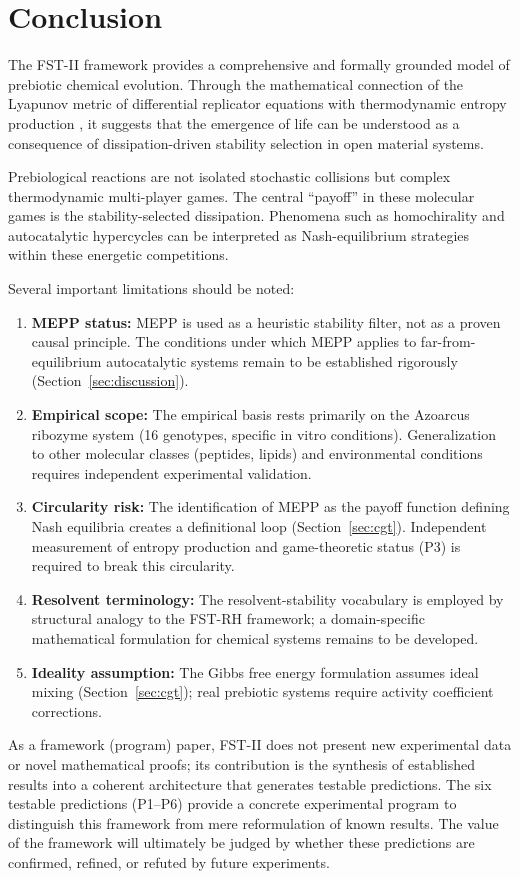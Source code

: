 \documentclass[12pt,a4paper]{article}
\theoremstyle{remark}
\begin{document}
\section{Conclusion}
\label{sec:conclusion}

The FST-II framework provides a comprehensive and formally grounded model of prebiotic chemical evolution. Through the mathematical connection of the Lyapunov metric of differential replicator equations with thermodynamic entropy production \citep{ReplicatorEntropy}, it suggests that the emergence of life can be understood as a consequence of dissipation-driven stability selection in open material systems.

Prebiological reactions are not isolated stochastic collisions but complex thermodynamic multi-player games. The central ``payoff'' in these molecular games is the stability-selected dissipation. Phenomena such as homochirality and autocatalytic hypercycles can be interpreted as Nash-equilibrium strategies within these energetic competitions.

Several important limitations should be noted:
\begin{enumerate}[label=(L\arabic*)]
    \item \textbf{MEPP status:} MEPP is used as a heuristic stability filter, not as a proven causal principle. The conditions under which MEPP applies to far-from-equilibrium autocatalytic systems remain to be established rigorously (Section~\ref{sec:discussion}).
    \item \textbf{Empirical scope:} The empirical basis rests primarily on the Azoarcus ribozyme system (16 genotypes, specific in vitro conditions). Generalization to other molecular classes (peptides, lipids) and environmental conditions requires independent experimental validation.
    \item \textbf{Circularity risk:} The identification of MEPP as the payoff function defining Nash equilibria creates a definitional loop (Section~\ref{sec:cgt}). Independent measurement of entropy production and game-theoretic status (P3) is required to break this circularity.
    \item \textbf{Resolvent terminology:} The resolvent-stability vocabulary is employed by structural analogy to the FST-RH framework; a domain-specific mathematical formulation for chemical systems remains to be developed.
    \item \textbf{Ideality assumption:} The Gibbs free energy formulation assumes ideal mixing (Section~\ref{sec:cgt}); real prebiotic systems require activity coefficient corrections.
\end{enumerate}
As a framework (program) paper, FST-II does not present new experimental data or novel mathematical proofs; its contribution is the synthesis of established results into a coherent architecture that generates testable predictions. The six testable predictions (P1--P6) provide a concrete experimental program to distinguish this framework from mere reformulation of known results. The value of the framework will ultimately be judged by whether these predictions are confirmed, refined, or refuted by future experiments.
\end{document}
